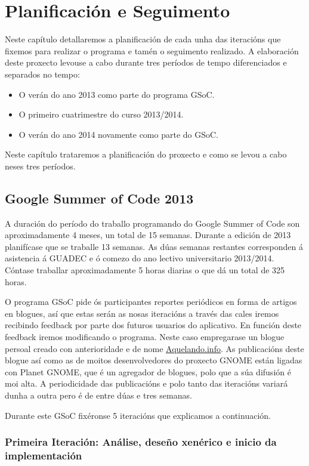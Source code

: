 \chapter{Planificación e Seguimento}

Neste capítulo detallaremos a planificación de cada unha das iteracións que fixemos para realizar o programa e tamén o seguimento realizado. A elaboración deste proxecto levouse a cabo durante tres períodos de tempo diferenciados e separados no tempo:

\begin{itemize}
  \item O verán do ano 2013 como parte do programa GSoC.
  \item O primeiro cuatrimestre do curso 2013/2014.
  \item O verán do ano 2014 novamente como parte do GSoC.
\end{itemize}

Neste capítulo trataremos a planificación do proxecto e como se levou a cabo neses tres períodos.

\section{Google Summer of Code 2013}
A duración do período do traballo programando do Google Summer of Code son aproximadamente 4 meses, un total de 15 semanas. Durante a edición de 2013 planifícase que se traballe 13 semanas. As dúas semanas restantes corresponden á asistencia á GUADEC e ó comezo do ano lectivo universitario 2013/2014. Cóntase traballar aproximadamente 5 horas diarias o que dá un total de 325 horas.

O programa GSoC pide ós participantes reportes periódicos en forma de artigos en blogues, así que estas serán as nosas iteracións a través das cales iremos recibindo feedback por parte dos futuros usuarios do aplicativo. En función deste feedback iremos modificando o programa. Neste caso empregarase un blogue persoal creado con anterioridade e de nome \href{http://aquelando.info}{Aquelando.info}. As publicacións deste blogue así como as de moitos desenvolvedores do proxecto GNOME están ligadas con Planet GNOME, que é un agregador de blogues, polo que a súa difusión é moi alta. A periodicidade das publicacións e polo tanto das iteracións variará dunha a outra pero é de entre dúas e tres semanas.

Durante este GSoC fixéronse 5 iteracións que explicamos a continuación.

\subsection{Primeira Iteración: Análise, deseño xenérico e inicio da implementación}

